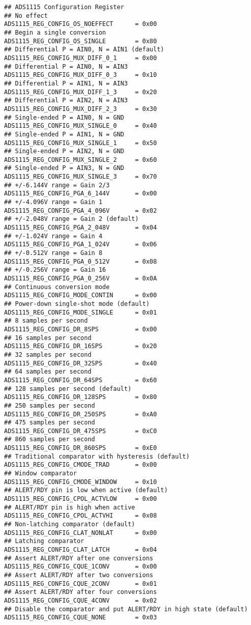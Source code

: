 \begin{lstlisting}[style=mystyle,caption={Code for ADC }]
## ADS1115 Configuration Register
## No effect
ADS1115_REG_CONFIG_OS_NOEFFECT		= 0x00 
## Begin a single conversion
ADS1115_REG_CONFIG_OS_SINGLE		= 0x80 
## Differential P = AIN0, N = AIN1 (default)
ADS1115_REG_CONFIG_MUX_DIFF_0_1		= 0x00 
## Differential P = AIN0, N = AIN3
ADS1115_REG_CONFIG_MUX_DIFF_0_3		= 0x10 
## Differential P = AIN1, N = AIN3
ADS1115_REG_CONFIG_MUX_DIFF_1_3		= 0x20 
## Differential P = AIN2, N = AIN3
ADS1115_REG_CONFIG_MUX_DIFF_2_3		= 0x30 
## Single-ended P = AIN0, N = GND
ADS1115_REG_CONFIG_MUX_SINGLE_0		= 0x40 
## Single-ended P = AIN1, N = GND
ADS1115_REG_CONFIG_MUX_SINGLE_1		= 0x50 
## Single-ended P = AIN2, N = GND
ADS1115_REG_CONFIG_MUX_SINGLE_2		= 0x60 
## Single-ended P = AIN3, N = GND
ADS1115_REG_CONFIG_MUX_SINGLE_3		= 0x70 
## +/-6.144V range = Gain 2/3
ADS1115_REG_CONFIG_PGA_6_144V		= 0x00 
## +/-4.096V range = Gain 1
ADS1115_REG_CONFIG_PGA_4_096V		= 0x02 
## +/-2.048V range = Gain 2 (default)
ADS1115_REG_CONFIG_PGA_2_048V		= 0x04 
## +/-1.024V range = Gain 4
ADS1115_REG_CONFIG_PGA_1_024V		= 0x06 
## +/-0.512V range = Gain 8
ADS1115_REG_CONFIG_PGA_0_512V		= 0x08 
## +/-0.256V range = Gain 16
ADS1115_REG_CONFIG_PGA_0_256V		= 0x0A
## Continuous conversion mode
ADS1115_REG_CONFIG_MODE_CONTIN		= 0x00 
## Power-down single-shot mode (default)
ADS1115_REG_CONFIG_MODE_SINGLE		= 0x01 
## 8 samples per second
ADS1115_REG_CONFIG_DR_8SPS			= 0x00 
## 16 samples per second
ADS1115_REG_CONFIG_DR_16SPS			= 0x20 
## 32 samples per second
ADS1115_REG_CONFIG_DR_32SPS			= 0x40 
## 64 samples per second
ADS1115_REG_CONFIG_DR_64SPS			= 0x60 
## 128 samples per second (default)
ADS1115_REG_CONFIG_DR_128SPS		= 0x80
## 250 samples per second
ADS1115_REG_CONFIG_DR_250SPS		= 0xA0 
## 475 samples per second
ADS1115_REG_CONFIG_DR_475SPS		= 0xC0 
## 860 samples per second
ADS1115_REG_CONFIG_DR_860SPS		= 0xE0 
## Traditional comparator with hysteresis (default)
ADS1115_REG_CONFIG_CMODE_TRAD		= 0x00 
## Window comparator
ADS1115_REG_CONFIG_CMODE_WINDOW		= 0x10 
## ALERT/RDY pin is low when active (default)
ADS1115_REG_CONFIG_CPOL_ACTVLOW		= 0x00 
## ALERT/RDY pin is high when active
ADS1115_REG_CONFIG_CPOL_ACTVHI		= 0x08 
## Non-latching comparator (default)
ADS1115_REG_CONFIG_CLAT_NONLAT		= 0x00 
## Latching comparator
ADS1115_REG_CONFIG_CLAT_LATCH		= 0x04 
## Assert ALERT/RDY after one conversions
ADS1115_REG_CONFIG_CQUE_1CONV		= 0x00 
## Assert ALERT/RDY after two conversions
ADS1115_REG_CONFIG_CQUE_2CONV		= 0x01 
## Assert ALERT/RDY after four conversions
ADS1115_REG_CONFIG_CQUE_4CONV		= 0x02 
## Disable the comparator and put ALERT/RDY in high state (default)
ADS1115_REG_CONFIG_CQUE_NONE		= 0x03 


\end{lstlisting}
